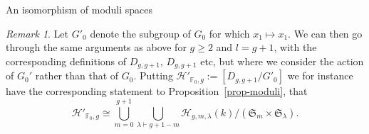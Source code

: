 \documentclass[10pt,a4paper,twoside]{amsart}
\theoremstyle{plain}
\theoremstyle{definition}
\theoremstyle{remark}
\newtheorem{rk}{Remark}[section]
\begin{document}
\begin{subsection}{An isomorphism of moduli spaces}
\begin{rk} \label{rk-H} Let $G'_0$ denote the subgroup of $G_0$ for which $x_1 \mapsto x_1$. We can then go through the same arguments as above for $g \geq 2$ and $l=g+1$, with the corresponding definitions of $D_{g,g+1}$, $D_{g,g+1}$ etc, but where we consider the action of $G_0'$ rather than that of $G_0$. Putting $\mathcal{H}'_{\mathbb{F}_0,g}:=\left[D_{g,g+1}/G'_0\right]$ we for instance have the corresponding statement to Proposition~\ref{prop-moduli}, 
that 
\begin{equation}\label{eq4}
    \mathcal{H}'_{\mathbb{F}_0,g} \cong \bigcup_{m=0}^{g+1} \bigcup_{\lambda \vdash g+1-m} \mathcal H_{g,m,\lambda}(k)/(\mathfrak S_m \times \mathfrak S_{\lambda}).
\end{equation}
\end{rk}
\end{subsection}
\end{document}
